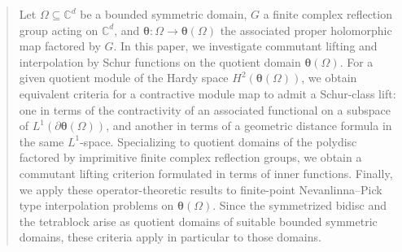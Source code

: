 \documentclass[12pt,reqno]{amsart}
\theoremstyle{remark}
\theoremstyle{definition}
\begin{document}
\begin{abstract}
Let $\Omega\subseteq \mathbb C^d$ be a bounded symmetric domain, $G$ a finite complex reflection group acting on $\mathbb C^d$, and $\boldsymbol \theta:\Omega\to \boldsymbol \theta(\Omega)$ the associated proper holomorphic map factored by $G.$ In this paper, we investigate commutant lifting and interpolation by Schur functions on the quotient domain $\boldsymbol \theta(\Omega).$
For a given quotient module of the Hardy space $H^2(\boldsymbol\theta(\Omega))$, 
we obtain equivalent criteria for a contractive module map to admit a Schur-class lift: one in terms of the contractivity of an associated functional on a subspace of $L^1(\partial\boldsymbol\theta(\Omega))$, and another in terms of a geometric distance formula in the same $L^1$-space.
Specializing to quotient domains of the polydisc factored by imprimitive finite complex reflection groups, we obtain a commutant lifting criterion formulated in terms of inner functions.
Finally, we apply these operator-theoretic results to finite-point Nevanlinna--Pick type interpolation problems on $\boldsymbol \theta(\Omega)$.  
Since the symmetrized bidisc and the tetrablock arise as quotient domains of suitable bounded symmetric domains, these criteria apply in particular to those domains.











\end{abstract}
\end{document}
